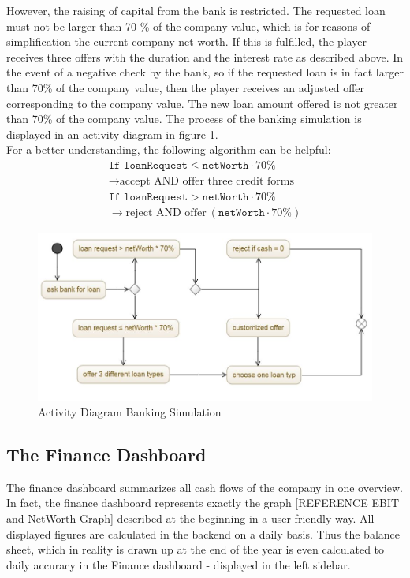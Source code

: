However, the raising of capital from the bank is restricted.
The requested loan must not be larger than 70 \% of the company value, which is for reasons of simplification the current company net worth. If this is fulfilled, the player receives three offers with the duration and the interest rate as described above. In the event of a negative check by the bank, so if the requested loan is in fact larger than 70\% of the company value, then the player receives an adjusted offer corresponding to the company value. The new loan amount offered is not greater than 70\% of the company value. The process of the banking simulation is displayed in an activity diagram in figure \ref{jpg:banking}.\\
For a better understanding, the following algorithm can be helpful:
\begin{equation}
    \begin{aligned}
         \texttt{If loanRequest} \leq \texttt{netWorth} \cdot 70\% \\ \xrightarrow{} \text{accept AND offer three credit forms} \\
         \texttt{If loanRequest} > \texttt{netWorth} \cdot 70\% \\ \xrightarrow{} \text{reject AND offer} \ (\texttt{netWorth} \cdot 70\%)
    \end{aligned}    
\end{equation}

\begin{figure}
	\centering
	\includegraphics[width=12cm]{images/activity_diagram.JPG}
	\caption{Activity Diagram Banking Simulation}
	\label{jpg:banking}
\end{figure}

\subsection{The Finance Dashboard}

The finance dashboard summarizes all cash flows of the company in one overview. In fact, the finance dashboard represents exactly the graph [REFERENCE EBIT and NetWorth Graph] described at the beginning in a user-friendly way. All displayed figures are calculated in the backend on a daily basis. Thus the balance sheet, which in reality is drawn up at the end of the year is even calculated to daily accuracy in the Finance dashboard - displayed in the left sidebar. %

